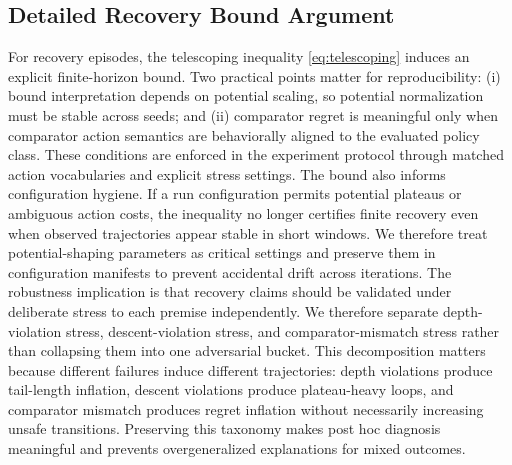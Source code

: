 \documentclass{article} %
\begin{document}
\subsection{Detailed Recovery Bound Argument}
For recovery episodes, the telescoping inequality \eqref{eq:telescoping} induces an explicit finite-horizon bound. Two practical points matter for reproducibility: (i) bound interpretation depends on potential scaling, so potential normalization must be stable across seeds; and (ii) comparator regret is meaningful only when comparator action semantics are behaviorally aligned to the evaluated policy class. These conditions are enforced in the experiment protocol through matched action vocabularies and explicit stress settings.
The bound also informs configuration hygiene. If a run configuration permits potential plateaus or ambiguous action costs, the inequality no longer certifies finite recovery even when observed trajectories appear stable in short windows. We therefore treat potential-shaping parameters as critical settings and preserve them in configuration manifests to prevent accidental drift across iterations.
The robustness implication is that recovery claims should be validated under deliberate stress to each premise independently. We therefore separate depth-violation stress, descent-violation stress, and comparator-mismatch stress rather than collapsing them into one adversarial bucket. This decomposition matters because different failures induce different trajectories: depth violations produce tail-length inflation, descent violations produce plateau-heavy loops, and comparator mismatch produces regret inflation without necessarily increasing unsafe transitions. Preserving this taxonomy makes post hoc diagnosis meaningful and prevents overgeneralized explanations for mixed outcomes.
\end{document}
